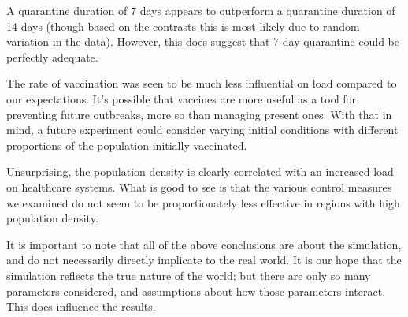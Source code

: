 \documentclass[12pt,a4paper]{article}
\begin{document}
A quarantine duration of 7 days appears to outperform a quarantine duration of 14 days (though based on the contrasts this is most likely due to random variation in the data). However, this does suggest that 7 day quarantine could be perfectly adequate.

The rate of vaccination was seen to be much less influential on load compared to our expectations. It's possible that vaccines are more useful as a tool for preventing future outbreaks, more so than managing present ones. With that in mind, a future experiment could consider varying initial conditions with different proportions of the population initially vaccinated.

Unsurprising, the population density is clearly correlated with an increased load on healthcare systems. What is good to see is that the various control measures we examined do not seem to be proportionately less effective in regions with high population density.

It is important to note that all of the above conclusions are about the simulation, and do not necessarily directly implicate to the real world. It is our hope that the simulation reflects the true nature of the world; but there are only so many parameters considered, and assumptions about how those parameters interact. This does influence the results.






\end{document}
